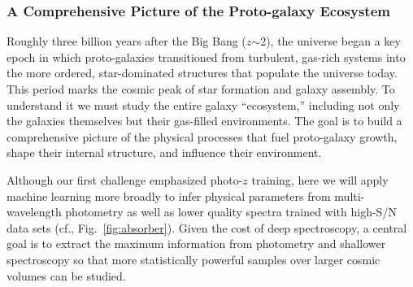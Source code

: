 \documentclass[oneside,11pt]{amsart}
\begin{document}
\subsubsection{A Comprehensive Picture of the Proto-galaxy Ecosystem}
\label{sec:galaxies}

%
%
%
%

Roughly three billion years after the Big Bang ($z$$\sim$2), the
universe began a key epoch in which proto-galaxies transitioned from
turbulent, gas-rich systems into the more ordered, star-dominated
structures that populate the universe today.  This period marks the
cosmic peak of star formation and galaxy assembly.   To understand it we must study the entire galaxy
``ecosystem,'' including not only the galaxies themselves but their
gas-filled environments.  The goal is to build a comprehensive picture
of the physical processes that fuel proto-galaxy growth, shape their
internal structure, and influence their environment.

Although our first challenge emphasized photo-$z$ training, here we will apply machine learning more broadly to infer
physical parameters from multi-wavelength photometry as well as lower quality spectra trained with high-S/N data sets 
(cf., Fig.~\ref{fig:absorber}).  Given the cost of deep spectroscopy, a central goal is to extract the maximum
information from photometry and shallower spectroscopy so that more statistically powerful samples over larger cosmic
volumes can be studied.
\end{document}
